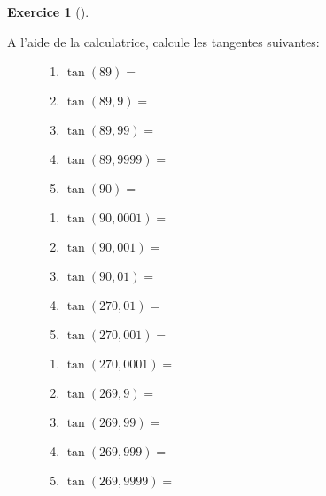 \documentclass[
  a4paper,
  DIV=11,
  numbers=noendperiod,
  oneside]{scrreprt}
\theoremstyle{definition}
\theoremstyle{definition}
\newtheorem{exercise}{Exercice}[chapter]
\theoremstyle{plain}
\theoremstyle{definition}
\theoremstyle{remark}
\begin{document}
\begin{exercise}[]\protect\hypertarget{exr-valtan}{}\label{exr-valtan}

A l'aide de la calculatrice, calcule les tangentes suivantes:

\begin{figure}

\begin{minipage}{0.33\linewidth}

\begin{enumerate}
\def\labelenumi{\arabic{enumi})}
\item
  \(\tan(89)=\) \dotfill
\item
  \(\tan(89,9)=\) \dotfill
\item
  \(\tan(89,99)=\) \dotfill
\item
  \(\tan(89,9999)=\) \dotfill
\item
  \(\tan(90)=\) \dotfill
\end{enumerate}

\end{minipage}%
%
\begin{minipage}{0.33\linewidth}

\begin{enumerate}
\def\labelenumi{\arabic{enumi})}
\setcounter{enumi}{5}
\item
  \(\tan(90,0001)=\) \dotfill
\item
  \(\tan(90,001)=\) \dotfill
\item
  \(\tan(90,01)=\) \dotfill
\item
  \(\tan(270,01)=\) \dotfill
\item
  \(\tan(270,001)=\) \dotfill
\end{enumerate}

\end{minipage}%
%
\begin{minipage}{0.34\linewidth}

\begin{enumerate}
\def\labelenumi{\arabic{enumi})}
\setcounter{enumi}{10}
\item
  \(\tan(270,0001)=\) \dotfill
\item
  \(\tan(269,9)=\) \dotfill
\item
  \(\tan(269,99)=\) \dotfill
\item
  \(\tan(269,999)=\) \dotfill
\item
  \(\tan(269,9999)=\) \dotfill
\end{enumerate}

\end{minipage}%

\end{figure}%

\end{exercise}
\end{document}
